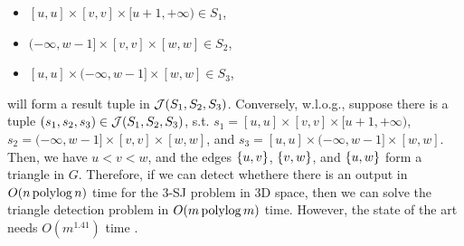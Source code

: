 \begin{itemize}
    \item $[u,u]\times [v,v]\times[u+1, +\infty)\in S_1$,
    \item $(-\infty,w-1]\times[v,v]\times [w,w] \in S_2$,
    \item $[u,u]\times(-\infty, w-1]\times [w,w] \in S_3$,
\end{itemize}
will form a result tuple in $\mathcal{J}(S_1,S_2,S_3)$. Conversely, w.l.o.g., suppose there is a tuple $(s_1,s_2,s_3)\in \mathcal{J}(S_1,S_2,S_3)$, s.t. $s_1 = [u,u]\times [v,v]\times[u+1, +\infty)$, $s_2 = (-\infty,w-1]\times[v,v]\times [w,w]$, and $s_3 = [u,u]\times(-\infty, w-1]\times [w,w]$. Then, we have $u < v < w$, and the edges $\{u,v\}$, $\{v,w\}$, and $\{u,w\}$ form a triangle in $G$. Therefore, if we can detect whethere there is an output in $O(n\operatorname*{polylog} n)$ time for the 3-SJ problem in 3D space, then we can solve the triangle detection problem 
in $O(m \operatorname*{polylog} m)$ time. However, the state of the art needs $O(m^{1.41})$ time \cite{ayz97}.